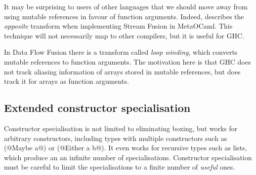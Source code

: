 It may be surprising to users of other languages that we should move away from using mutable references in favour of function arguments.
Indeed, \citet{biboudis2017expressive} describes the \emph{opposite} transform when implementing Stream Fusion in MetaOCaml.
This technique will not necessarily map to other compilers, but it is useful for GHC.

In Data Flow Fusion \cite{lippmeier2013data} there is a transform called \emph{loop winding}, which converts mutable references to function arguments.
The motivation here is that GHC does not track aliasing information of arrays stored in mutable references, but does track it for arrays as function arguments.

\subsection{Extended constructor specialisation}

Constructor specialisation is not limited to eliminating boxing, but works for arbitrary constructors, including types with multiple constructors such as (@Maybe a@) or (@Either a b@).
It even works for recursive types such as lists, which produce an an infinite number of specialisations.
Constructor specialisation must be careful to limit the specialisations to a finite number of \emph{useful} ones.

